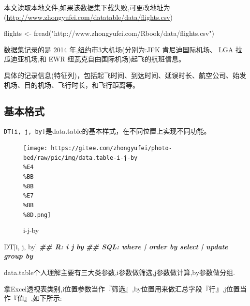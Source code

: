 \documentclass[
]{book}
\newenvironment{Shaded}{\begin{snugshade}}{\end{snugshade}}
\newcommand{\DocumentationTok}[1]{\textcolor[rgb]{0.56,0.35,0.01}{\textbf{\textit{#1}}}}
\newcommand{\FunctionTok}[1]{\textcolor[rgb]{0.00,0.00,0.00}{#1}}
\newcommand{\NormalTok}[1]{#1}
\newcommand{\OtherTok}[1]{\textcolor[rgb]{0.56,0.35,0.01}{#1}}
\newcommand{\StringTok}[1]{\textcolor[rgb]{0.31,0.60,0.02}{#1}}
\begin{document}
本文读取本地文件,如果该数据集下载失败,可更改地址为(\url{http://www.zhongyufei.com/datatable/data/flights.csv})

\begin{Shaded}
\begin{Highlighting}[]
\NormalTok{flights }\OtherTok{\textless{}{-}} \FunctionTok{fread}\NormalTok{(}\StringTok{"http://www.zhongyufei.com/Rbook/data/flights.csv"}\NormalTok{)}
\end{Highlighting}
\end{Shaded}

数据集记录的是 2014 年,纽约市3大机场(分别为:JFK 肯尼迪国际机场、 LGA 拉瓜迪亚机场,和 EWR 纽瓦克自由国际机场)起飞的航班信息。

具体的记录信息(特征列)，包括起飞时间、到达时间、延误时长、航空公司、始发机场、目的机场、飞行时长，和飞行距离等。

\hypertarget{ux57faux672cux683cux5f0f}{%
\subsection{基本格式}\label{ux57faux672cux683cux5f0f}}

\texttt{DT{[}i,\ j,\ by{]}}是data.table的基本样式，在不同位置上实现不同功能。

\begin{figure}
\centering
\texttt{[image: https://gitee.com/zhongyufei/photo-bed/raw/pic/img/data.table-i-j-by\\\%E4\\\%BB\\\%8B\\\%E7\\\%BB\\\%8D.png]}
\caption{i-j-by}
\end{figure}

\begin{Shaded}
\begin{Highlighting}[]
\NormalTok{DT[i, j, by]}
\DocumentationTok{\#\#   R:                 i                 j        by}
\DocumentationTok{\#\# SQL:  where | order by   select | update  group by}
\end{Highlighting}
\end{Shaded}

data.table个人理解主要有三大类参数,i参数做筛选,j参数做计算,by参数做分组.

拿Excel透视表类别,i位置参数当作『筛选』,by位置用来做汇总字段『行』,j位置当作『值』,如下所示:
\end{document}
